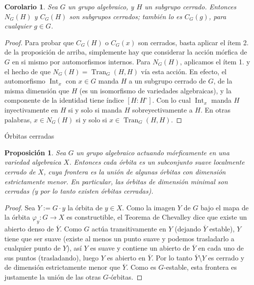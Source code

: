 \documentclass[spanish,12pt]{amsart}
\makeatletter
\renewcommand\subsection{\@startsection{subsection}{2}%
  \z@{.5\linespacing\@plus.7\linespacing}{-.5em}%
  {\normalfont\sffamily}}
\newtheorem{corollary}[theorem]{Corolario}
\newtheorem{proposition}[theorem]{Proposición}
\theoremstyle{definition}
\theoremstyle{remark}
\numberwithin{equation}{section}
\renewcommand{\bar}[1]{\overline{#1}}
\makeatother
\begin{document}
\begin{corollary}
Sea $G$ un grupo algebraico, y $H$ un subgrupo cerrado. Entonces $N_G (H)$ y $C_G (H)$ son subgrupos cerrados; también lo es $C_G (g)$, para cualquier $g \in G$.
\end{corollary}
\begin{proof}
Para probar que $C_G (H)$ o $C_G (x)$ son cerrados, basta aplicar el ítem 2. de la proposición de arriba, simplemente hay que considerar la acción mórfica de $G$ en si mismo por automorfismos internos. Para $N_G (H)$, aplicamos el ítem 1. y el hecho de que $N_G (H) = \operatorname{Tran}_G (H,H)$ vía esta acción. En efecto, el automorfismo $\operatorname{Int}_x$ con $x \in G$ manda $H$ a un subgrupo cerrado de $G$, de la misma dimensión que $H$ (es un isomorfismo de variedades algebraicas), y la componente de la identidad tiene índice $[H : H^\circ]$. Con lo cual $\operatorname{Int}_x$ manda $H$ inyectivamente en $H$ si y solo si manda $H$ sobreyectivamente a $H$. En otras palabras, $x \in N_G (H)$ si y solo si $x \in \operatorname {Tran}_G (H, H)$.
\end{proof}



\subsection{Órbitas cerradas}

\begin{proposition}\label{proposition:orbita cerrada}
Sea $G$ un grupo algebraico actuando mórficamente en una variedad algebraica $X$. Entonces cada órbita es un subconjunto suave localmente cerrado de $X$, cuya frontera es la unión de algunas órbitas con dimensión estrictamente menor. En particular, las órbitas de dimensión minimal son cerradas (y por lo tanto existen órbitas cerradas).
\end{proposition}

\begin{proof}
Sea $Y := G \cdot y$ la órbita de $y \in X$. Como la imagen $Y$ de $G$ bajo el mapa de la órbita $\varphi_y : G \to X$ es constructible, el Teorema de Chevalley dice que existe un abierto denso de $\bar Y$. Como $G$ actúa transitivamente en $Y$ (dejando $\bar Y$ estable), $Y$ tiene que ser suave (existe al menos un punto suave y podemos trasladarlo a cualquier punto de $Y$), así $Y$ es suave y contiene un abierto de $\bar Y$ en cada uno de sus puntos (trasladando), luego $Y$ es abierto en $\bar Y$. Por lo tanto $\bar Y \setminus Y$ es cerrado y de dimensión estrictamente menor que $\bar Y$. Como es $G$-estable, esta frontera es justamente la unión de las otras $G$-órbitas.
\end{proof}
\end{document}
